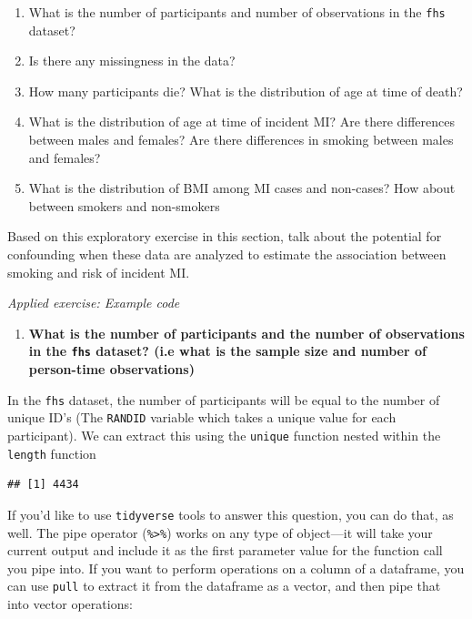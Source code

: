 \documentclass[
]{book}
\newenvironment{Shaded}{\begin{snugshade}}{\end{snugshade}}
\newcommand{\KeywordTok}[1]{\textcolor[rgb]{0.13,0.29,0.53}{\textbf{#1}}}
\newcommand{\NormalTok}[1]{#1}
\newcommand{\OperatorTok}[1]{\textcolor[rgb]{0.81,0.36,0.00}{\textbf{#1}}}
\providecommand{\tightlist}{%
  \setlength{\itemsep}{0pt}\setlength{\parskip}{0pt}}
\begin{document}
\begin{enumerate}
\def\labelenumi{\arabic{enumi}.}
\tightlist
\item
  What is the number of participants and number of observations in the \texttt{fhs} dataset?
\item
  Is there any missingness in the data?
\item
  How many participants die? What is the distribution of age at time of death?
\item
  What is the distribution of age at time of incident MI? Are there differences between males and females? Are there differences in smoking between males and females?
\item
  What is the distribution of BMI among MI cases and non-cases? How about between smokers and non-smokers
\end{enumerate}

Based on this exploratory exercise in this section, talk about the potential
for confounding when these data are analyzed to estimate the association between
smoking and risk of incident MI.

\emph{Applied exercise: Example code}

\begin{enumerate}
\def\labelenumi{\arabic{enumi}.}
\tightlist
\item
  \textbf{What is the number of participants and the number of observations in the \texttt{fhs} dataset? (i.e what is the sample size and number of person-time observations)}
\end{enumerate}

In the \texttt{fhs} dataset, the number of participants will be equal to the number of unique ID's (The \texttt{RANDID} variable which takes a unique value for each participant). We can extract this using the \texttt{unique} function nested within the \texttt{length} function

\begin{Shaded}
\end{Shaded}

\begin{verbatim}
## [1] 4434
\end{verbatim}

If you'd like to use \texttt{tidyverse} tools to answer this question, you can do
that, as well. The pipe operator (\texttt{\%\textgreater{}\%}) works on any type of object---it will
take your current output and include it as the first parameter value for the
function call you pipe into. If you want to perform operations on a column of
a dataframe, you can use \texttt{pull} to extract it from the dataframe as a vector, and
then pipe that into vector operations:
\end{document}
